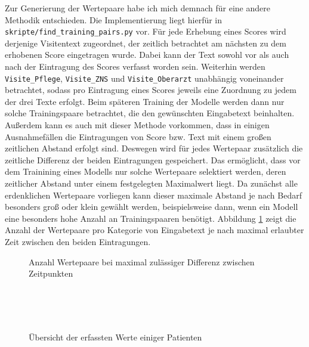 Zur Generierung der Wertepaare habe ich mich demnach für eine andere Methodik entschieden. Die Implementierung liegt hierfür in \texttt{skripte/find\_training\_pairs.py} vor. Für jede Erhebung eines Scores wird derjenige Visitentext zugeordnet, der zeitlich betrachtet am nächsten zu dem erhobenen Score eingetragen wurde. Dabei kann der Text sowohl vor als auch nach der Eintragung des Scores verfasst worden sein. Weiterhin werden \texttt{Visite\_Pflege}, \texttt{Visite\_ZNS} und \texttt{Visite\_Oberarzt} unabhängig voneinander betrachtet, sodass pro Eintragung eines Scores jeweils eine Zuordnung zu jedem der drei Texte erfolgt. Beim späteren Training der Modelle werden dann nur solche Trainingspaare betrachtet, die den gewünschten Eingabetext beinhalten. Außerdem kann es auch mit dieser Methode vorkommen, dass in einigen Ausnahmefällen die Eintragungen von Score bzw. Text mit einem großen zeitlichen Abstand erfolgt sind. Deswegen wird für jedes Wertepaar zusätzlich die zeitliche Differenz der beiden Eintragungen gespeichert. Das ermöglicht, dass vor dem Trainining eines Modells nur solche Wertepaare selektiert werden, deren zeitlicher Abstand unter einem festgelegten Maximalwert liegt. Da zunächst alle erdenklichen Wertepaare vorliegen kann dieser maximale Abstand je nach Bedarf besonders groß oder klein gewählt werden, beispielsweise dann, wenn ein Modell eine besonders hohe Anzahl an Trainingspaaren benötigt. Abbildung \ref{fig:n_pairs_by_max_offset} zeigt die Anzahl der Wertepaare pro Kategorie von Eingabetext je nach maximal erlaubter Zeit zwischen den beiden Eintragungen.

\begin{figure}[htp]
    \captionsetup{justification=centering}
    \centering
    \quad
    \caption{Anzahl Wertepaare bei maximal zulässiger Differenz zwischen \mbox{Zeitpunkten}}
    \label{fig:n_pairs_by_max_offset}
\end{figure}

\begin{figure}[p]
    \centering
     \\
     \\
     \\
    \caption{Übersicht der erfassten Werte einiger Patienten}
    \label{fig:pat_example_scatterplots}
\end{figure}

